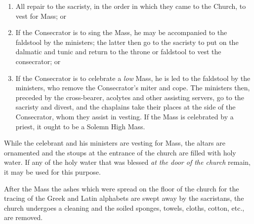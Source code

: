 \documentclass[letterpaper]{report}
\begin{document}
{\begin{enumerate}
        \item All repair to the sacristy, in the order in which they came to the
            Church, to vest for Mass; or

        \item If the Consecrator is to sing the Mass, he may be accompanied to the
            faldstool by the ministers; the latter then go to the sacristy to put
            on the dalmatic and tunic and return to the throne or faldstool to vest
            the consecrator; or

        \item If the Consecrator is to celebrate a \textit{low} Mass, he is led to
            the faldstool by the ministers, who remove the Consecrator's miter and
            cope. The ministers then, preceded by the cross-bearer, acolytes and
            other assisting servers, go to the sacristy and divest, and the
            chaplains take their places at the side of the Consecrator, whom they
            assist in vesting. If the Mass is celebrated by a priest, it ought to
            be a Solemn High Mass.
        
    \end{enumerate}

    \rubric While the celebrant and his ministers are vesting for Mass, the altars
    are ornamented and the stoups at the entrance of the church are filled with
    holy water. If any of the holy water that was blessed \textit{at the door of
    the church} remain, it may be used for this purpose.

    \rubric After the Mass the ashes which were spread on the floor of the church
    for the tracing of the Greek and Latin alphabets are swept away by the
    sacristans, the church undergoes a cleaning and the soiled sponges, towels,
    cloths, cotton, etc., are removed.

}
\end{document}
